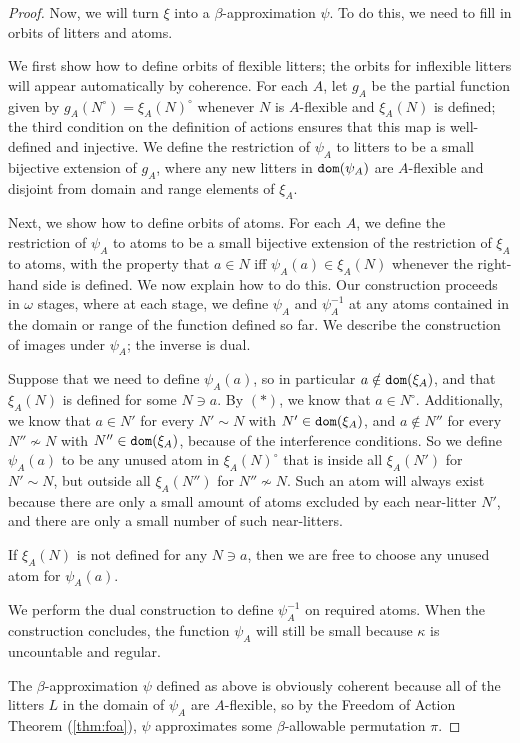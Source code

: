 \documentclass{article}
\theoremstyle{definition}
\theoremstyle{remark}
\begin{document}
{\begin{proof}
  Now, we will turn $\xi$ into a $\beta$-approximation $\psi$.
  To do this, we need to fill in orbits of litters and atoms.

  We first show how to define orbits of flexible litters; the orbits for inflexible litters will appear automatically by coherence.
  For each $A$, let $g_A$ be the partial function given by $g_A(N^\circ) = \xi_A(N)^\circ$ whenever $N$ is $A$-flexible and $\xi_A(N)$ is defined; the third condition on the definition of actions ensures that this map is well-defined and injective.
  We define the restriction of $\psi_A$ to litters to be a small bijective extension of $g_A$, where any new litters in ${\tt dom}(\psi_A)$ are $A$-flexible and disjoint from domain and range elements of $\xi_A$.

  Next, we show how to define orbits of atoms.
  For each $A$, we define the restriction of $\psi_A$ to atoms to be a small bijective extension of the restriction of $\xi_A$ to atoms, with the property that $a \in N$ iff $\psi_A(a) \in \xi_A(N)$ whenever the right-hand side is defined.
  We now explain how to do this.
  Our construction proceeds in $\omega$ stages, where at each stage, we define $\psi_A$ and $\psi_A^{-1}$ at any atoms contained in the domain or range of the function defined so far.
  We describe the construction of images under $\psi_A$; the inverse is dual.

  Suppose that we need to define $\psi_A(a)$, so in particular $a \notin {\tt dom}(\xi_A)$, and that $\xi_A(N)$ is defined for some $N \ni a$.
  By $(*)$, we know that $a \in N^\circ$.
  Additionally, we know that $a \in N'$ for every $N' \sim N$ with $N' \in {\tt dom}(\xi_A)$, and $a \notin N''$ for every $N'' \nsim N$ with $N'' \in {\tt dom}(\xi_A)$, because of the interference conditions.
  So we define $\psi_A(a)$ to be any unused atom in $\xi_A(N)^\circ$ that is inside all $\xi_A(N')$ for $N' \sim N$, but outside all $\xi_A(N'')$ for $N'' \nsim N$.
  Such an atom will always exist because there are only a small amount of atoms excluded by each near-litter $N'$, and there are only a small number of such near-litters.

  If $\xi_A(N)$ is not defined for any $N \ni a$, then we are free to choose any unused atom for $\psi_A(a)$.

  We perform the dual construction to define $\psi_A^{-1}$ on required atoms.
  When the construction concludes, the function $\psi_A$ will still be small because $\kappa$ is uncountable and regular.

  The $\beta$-approximation $\psi$ defined as above is obviously coherent because all of the litters $L$ in the domain of $\psi_A$ are $A$-flexible, so by the Freedom of Action Theorem (\ref{thm:foa}), $\psi$ approximates some $\beta$-allowable permutation $\pi$.


\end{proof}}
\end{document}

